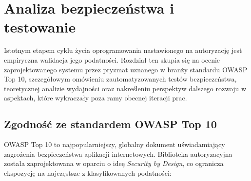 \documentclass{SGGW-thesis}
\begin{document}
\clearpage

\startchapterfromoddpage
\chapter{Analiza bezpieczeństwa i testowanie}

Istotnym etapem cyklu życia oprogramowania nastawionego na autoryzację jest empiryczna walidacja jego podatności. Rozdział ten skupia się na ocenie zaprojektowanego systemu przez pryzmat uznanego w branży standardu OWASP Top 10, szczegółowym omówieniu zautomatyzowanych testów bezpieczeństwa, teoretycznej analizie wydajności oraz nakreśleniu perspektyw dalszego rozwoju w aspektach, które wykraczały poza ramy obecnej iteracji prac.

\section{Zgodność ze standardem OWASP Top 10}

OWASP Top 10 to najpopularniejszy, globalny dokument uświadamiający zagrożenia bezpieczeństwa aplikacji internetowych. Biblioteka autoryzacyjna została zaprojektowana w oparciu o ideę \textit{Security by Design}, co ogranicza ekspozycję na najczęstsze z klasyfikowanych podatności:
\end{document}
